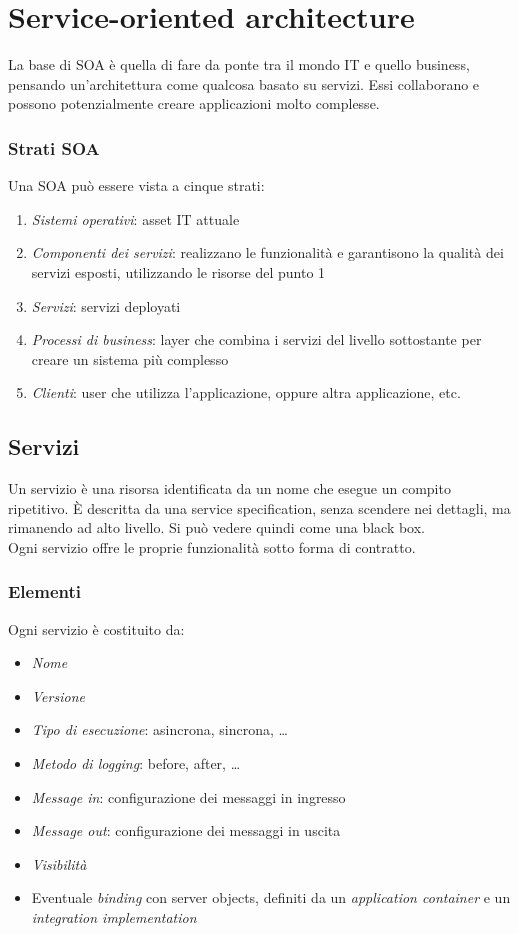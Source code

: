 \section{Service-oriented architecture}
La base di SOA è quella di fare da ponte tra il mondo IT e quello business, 
pensando un'architettura come qualcosa basato su servizi.
Essi collaborano e possono potenzialmente creare applicazioni molto complesse.

\subsubsection{Strati SOA}
Una SOA può essere vista a cinque strati:
\begin{enumerate}
    \item \emph{Sistemi operativi}: asset IT attuale
    \item \emph{Componenti dei servizi}: realizzano le funzionalità e garantisono la qualità
    dei servizi esposti, utilizzando le risorse del punto 1
    \item \emph{Servizi}: servizi deployati
    \item \emph{Processi di business}: layer che combina i servizi del livello sottostante
    per creare un sistema più complesso
    \item \emph{Clienti}: user che utilizza l'applicazione, oppure altra applicazione, etc. 
\end{enumerate}

\subsection{Servizi}
Un servizio è una risorsa identificata da un nome che esegue un compito ripetitivo.
È descritta da una service specification, senza scendere nei dettagli, ma rimanendo 
ad alto livello. Si può vedere quindi come una black box.\\
Ogni servizio offre le proprie funzionalità sotto forma di contratto.
\subsubsection{Elementi}
Ogni servizio è costituito da:
\begin{itemize}
    \item \emph{Nome}
    \item \emph{Versione}
    \item \emph{Tipo di esecuzione}: asincrona, sincrona, \dots
    \item \emph{Metodo di logging}: before, after, \dots
    \item \emph{Message in}: configurazione dei messaggi in ingresso
    \item \emph{Message out}: configurazione dei messaggi in uscita
    \item \emph{Visibilità}
    \item Eventuale \emph{binding} con server objects, definiti da un \emph{application 
    container} e un \emph{integration implementation}
\end{itemize}

